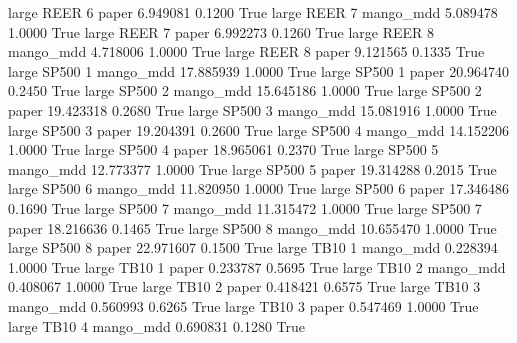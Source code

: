      large     REER                 6                 paper      6.949081      0.1200    True
     large     REER                 7             mango_mdd      5.089478      1.0000    True
     large     REER                 7                 paper      6.992273      0.1260    True
     large     REER                 8             mango_mdd      4.718006      1.0000    True
     large     REER                 8                 paper      9.121565      0.1335    True
     large    SP500                 1             mango_mdd     17.885939      1.0000    True
     large    SP500                 1                 paper     20.964740      0.2450    True
     large    SP500                 2             mango_mdd     15.645186      1.0000    True
     large    SP500                 2                 paper     19.423318      0.2680    True
     large    SP500                 3             mango_mdd     15.081916      1.0000    True
     large    SP500                 3                 paper     19.204391      0.2600    True
     large    SP500                 4             mango_mdd     14.152206      1.0000    True
     large    SP500                 4                 paper     18.965061      0.2370    True
     large    SP500                 5             mango_mdd     12.773377      1.0000    True
     large    SP500                 5                 paper     19.314288      0.2015    True
     large    SP500                 6             mango_mdd     11.820950      1.0000    True
     large    SP500                 6                 paper     17.346486      0.1690    True
     large    SP500                 7             mango_mdd     11.315472      1.0000    True
     large    SP500                 7                 paper     18.216636      0.1465    True
     large    SP500                 8             mango_mdd     10.655470      1.0000    True
     large    SP500                 8                 paper     22.971607      0.1500    True
     large     TB10                 1             mango_mdd      0.228394      1.0000    True
     large     TB10                 1                 paper      0.233787      0.5695    True
     large     TB10                 2             mango_mdd      0.408067      1.0000    True
     large     TB10                 2                 paper      0.418421      0.6575    True
     large     TB10                 3             mango_mdd      0.560993      0.6265    True
     large     TB10                 3                 paper      0.547469      1.0000    True
     large     TB10                 4             mango_mdd      0.690831      0.1280    True
